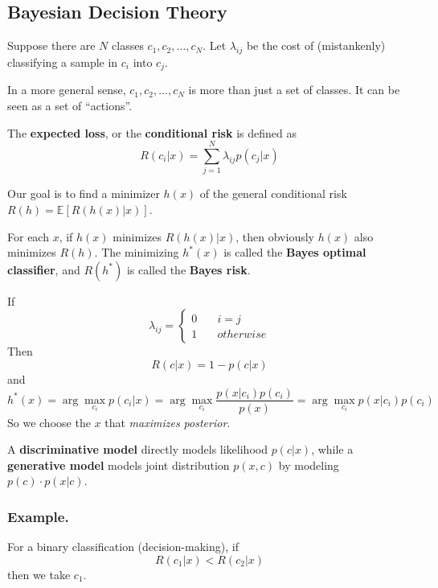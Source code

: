     \subsection{Bayesian Decision Theory}
        Suppose there are $N$ classes $c_1,c_2,\dots,c_N$. Let $\lambda_{ij}$ be the cost of (mistankenly) classifying a sample in $c_i$ into $c_j$.
        \begin{remark}
            In a more general sense, $c_1, c_2, \dots, c_N$ is more than just a set of classes. It can be seen as a set of ``actions''.
        \end{remark}

        \begin{definition}
            The \textbf{expected loss}, or the \textbf{conditional risk} is defined as
            \[ R(c_i|x) = \sum_{j=1}^N \lambda_{ij}p(c_j|x) \]
        \end{definition}
        Our goal is to find a minimizer $h(x)$ of the general conditional risk $R(h) = \mathbb{E}[R(h(x)|x)]$.

        For each $x$, if $h(x)$ minimizes $R(h(x)|x)$, then obviously $h(x)$ also minimizes $R(h)$. The minimizing $h^*(x)$ is called the \textbf{Bayes optimal classifier}, and $R(h^*)$ is called the \textbf{Bayes risk}.

        If
        \[
        \lambda_{ij} = 
        \begin{cases}
            0 \quad & i = j\\
            1 \quad & otherwise
        \end{cases}    
        \]
        Then
        \[ R(c|x) = 1 - p(c|x) \]
        and
        \[ h^*(x) = \arg \max_{c_i} p(c_i|x) = \arg \max_{c_i} \frac{p(x|c_i)p(c_i)}{p(x)} = \arg\max_{c_i} p(x|c_i)p(c_i)\]
        So we choose the $x$ that \emph{maximizes posterior}.

        \begin{remark}
            A \textbf{discriminative model} directly models likelihood $p(c|x)$, while a \textbf{generative model} models joint distribution $p(x,c)$ by modeling $p(c) \cdot p(x|c)$.
        \end{remark}

        \subsubsection{Example.}
        For a binary classification (decision-making), if
        \[ R(c_1|x) < R(c_2|x) \]
        then we take $c_1$.

